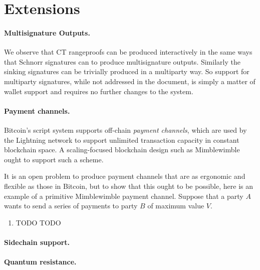 \documentclass[letterpaper]{article}
\begin{document}
\section{Extensions\label{sec:ext}}

\paragraph{Multisignature Outputs.} We observe that CT rangeproofs can be
produced interactively in the same ways that Schnorr signatures can to
produce multisignature outputs. Similarly the sinking signatures can be
trivially produced in a multiparty way. So support for multiparty signatures,
while not addressed in the document, is simply a matter of wallet support
and requires no further changes to the system.

\paragraph{Payment channels.} Bitcoin's script system supports off-chain
\emph{payment channels}, which are used by the Lightning network\cite{poon+dryja2016}
to support unlimited transaction capacity in constant blockchain space.
A scaling-focused blockchain design such as Mimblewimble ought to support
such a scheme.

It is an open problem to produce payment channels that are as ergonomic
and flexible as those in Bitcoin, but to show that this ought to be possible,
here is an example of a primitive Mimblewimble payment channel. Suppose that
a party $A$ wants to send a series of payments to party $B$ of maximum value
$V$.
\begin{enumerate}
\item  TODO TODO
\end{enumerate}

\paragraph{Sidechain support.}

\paragraph{Quantum resistance.}

\nolinenumbers

\clearpage


\end{document}
